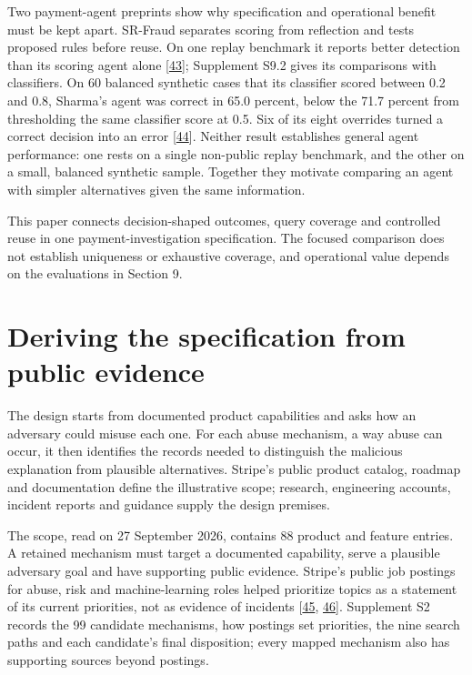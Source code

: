 \documentclass[acmlarge,nonacm]{acmart}
\begin{document}
Two payment-agent preprints show why specification and operational
benefit must be kept apart. SR-Fraud separates scoring from reflection
and tests proposed rules before reuse. On one replay benchmark it
reports better detection than its scoring agent alone
{[}\protect\hyperlink{ref-Tan2026SRFraud}{43}{]}; Supplement S9.2 gives
its comparisons with classifiers. On 60 balanced synthetic cases that
its classifier scored between 0.2 and 0.8, Sharma's agent was correct in
65.0 percent, below the 71.7 percent from thresholding the same
classifier score at 0.5. Six of its eight overrides turned a correct
decision into an error
{[}\protect\hyperlink{ref-Sharma2026AuditableFraud}{44}{]}. Neither
result establishes general agent performance: one rests on a single
non-public replay benchmark, and the other on a small, balanced
synthetic sample. Together they motivate comparing an agent with simpler
alternatives given the same information.

This paper connects decision-shaped outcomes, query coverage and
controlled reuse in one payment-investigation specification. The focused
comparison does not establish uniqueness or exhaustive coverage, and
operational value depends on the evaluations in Section 9.

\hypertarget{deriving-the-specification-from-public-evidence}{%
\section{Deriving the specification from public
evidence}\label{deriving-the-specification-from-public-evidence}}

The design starts from documented product capabilities and asks how an
adversary could misuse each one. For each abuse mechanism, a way abuse
can occur, it then identifies the records needed to distinguish the
malicious explanation from plausible alternatives. Stripe's public
product catalog, roadmap and documentation define the illustrative
scope; research, engineering accounts, incident reports and guidance
supply the design premises.

The scope, read on 27 September 2026, contains 88 product and feature
entries. A retained mechanism must target a documented capability, serve
a plausible adversary goal and have supporting public evidence. Stripe's
public job postings for abuse, risk and machine-learning roles helped
prioritize topics as a statement of its current priorities, not as
evidence of incidents {[}\protect\hyperlink{ref-Stripe2026}{45},
\protect\hyperlink{ref-StripeARE2026}{46}{]}. Supplement S2 records the
99 candidate mechanisms, how postings set priorities, the nine search
paths and each candidate's final disposition; every mapped mechanism
also has supporting sources beyond postings.
\end{document}

